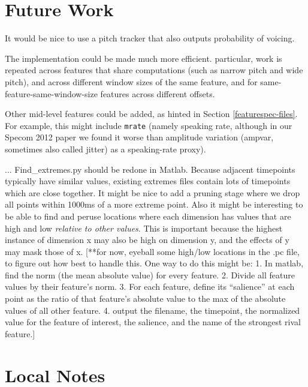 \documentclass[11pt]{article}
\begin{document}
\section{Future Work}

It would be nice to use a pitch tracker that also outputs probability
of voicing.

The implementation could be made much more efficient. 
particular, work is repeated across features that share computations
(such as narrow pitch and wide pitch), and across different window
sizes of the same feature, and for same-feature-same-window-size
features across different offsets. 

Other mid-level features could be added, as hinted in Section
\ref{featurespec-files}.  For example, this might include {\tt mrate}
(namely speaking rate, although in our Specom 2012 paper we found it
worse than amplitude variation (ampvar, sometimes also called jitter)
as a speaking-rate proxy).

... Find\_extremes.py should be redone in Matlab.  Because adjacent
timepoints typically have similar values, existing extremes files
contain lots of timepoints which are close together.  It might be nice
to add a pruning stage where we drop all points within 1000ms of a
more extreme point.  Also it might be interesting to be able to find
and peruse locations where each dimension has values that are high and
low {\em relative to other values}.  This is important because the
highest instance of dimension x may also be high on dimension y, and
the effects of y may mask those of x.  [**for now, eyeball some
  high/low locations in the{ .pc} file, to figure out how best to
  handle this.  One way to do this might be: 1. In matlab, find the
  norm (the mean absolute value) for every feature.  2. Divide all
  feature values by their feature's norm.  3. For each feature, define
  its ``salience'' at each point as the ratio of that feature's
  absolute value to the max of the absolute values of all other
  feature.  4.  output the filename, the timepoint, the normalized
  value for the feature of interest, the salience, and the name of the
  strongest rival feature.]

%


\section{Local Notes}
\end{document}
